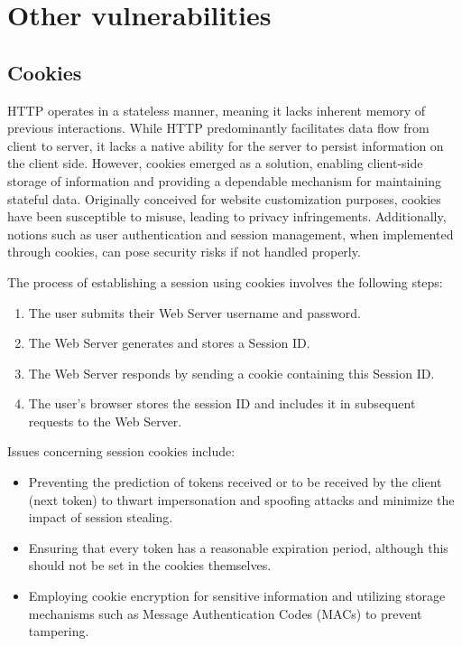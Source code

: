 \section{Other vulnerabilities}

\subsection{Cookies}
HTTP operates in a stateless manner, meaning it lacks inherent memory of previous interactions. 
While HTTP predominantly facilitates data flow from client to server, it lacks a native ability for the server to persist information on the client side. 
However, cookies emerged as a solution, enabling client-side storage of information and providing a dependable mechanism for maintaining stateful data.
Originally conceived for website customization purposes, cookies have been susceptible to misuse, leading to privacy infringements. 
Additionally, notions such as user authentication and session management, when implemented through cookies, can pose security risks if not handled properly.

The process of establishing a session using cookies involves the following steps:
\begin{enumerate}
\item The user submits their Web Server username and password.
\item The Web Server generates and stores a Session ID.
\item The Web Server responds by sending a cookie containing this Session ID.
\item The user's browser stores the session ID and includes it in subsequent requests to the Web Server.
\end{enumerate}
Issues concerning session cookies include:
\begin{itemize}
    \item Preventing the prediction of tokens received or to be received by the client (next token) to thwart impersonation and spoofing attacks and minimize the impact of session stealing.
    \item Ensuring that every token has a reasonable expiration period, although this should not be set in the cookies themselves.
    \item Employing cookie encryption for sensitive information and utilizing storage mechanisms such as Message Authentication Codes (MACs) to prevent tampering.
\end{itemize}

